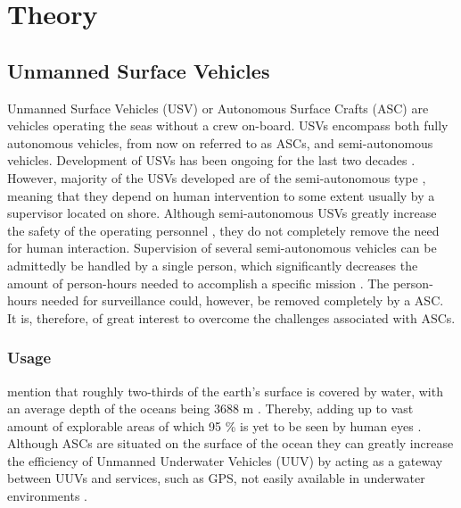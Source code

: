 
\chapter{Theory} %

\label{Theory} %

\section{Unmanned Surface Vehicles}
\cite{jokioinen2016remote}

Unmanned Surface Vehicles (USV) or Autonomous Surface Crafts (ASC) are vehicles operating the seas without a crew on-board.
USVs encompass both fully autonomous vehicles, from now on referred to as ASCs, and semi-autonomous vehicles.
Development of USVs has been ongoing for the last two decades \cite{manley2008unmanned}.
However, majority of the USVs developed are of the semi-autonomous type \cite{liu2016unmanned,park2017development}, meaning that they depend on human intervention to some extent usually by a supervisor located on shore.
Although semi-autonomous USVs greatly increase the safety of the operating personnel \cite{liu2016unmanned}, they do not completely remove the need for human interaction.
Supervision of several semi-autonomous vehicles can be admittedly be handled by a single person, which significantly decreases the amount of person-hours needed to accomplish a specific mission \cite{manley2008unmanned}.
The person-hours needed for surveillance could, however, be removed completely by a ASC.
It is, therefore, of great interest to overcome the challenges associated with ASCs.



\subsection{Usage}
\textcite{Yuh2011} mention that roughly two-thirds of the earth's surface is covered by water, with an average depth of the oceans being 3688 m \cite{depth_ocean}.
Thereby, adding up to vast amount of explorable areas of which 95 \% is yet to be seen by human eyes \cite{explored_percentage}.
Although ASCs are situated on the surface of the ocean they can greatly increase the efficiency of Unmanned Underwater Vehicles (UUV) by acting as a gateway between UUVs and services, such as GPS, not easily available in underwater environments \cite{liu2016unmanned}.


